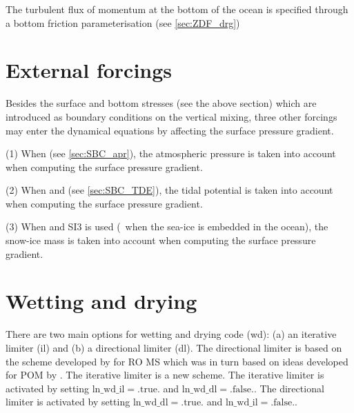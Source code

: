 \documentclass[../main/NEMO_manual]{subfiles}
\begin{document}
The turbulent flux of momentum at the bottom of the ocean is specified through a bottom friction parameterisation
(see \autoref{sec:ZDF_drg})

\section{External forcings}
\label{sec:DYN_forcing}

Besides the surface and bottom stresses (see the above section)
which are introduced as boundary conditions on the vertical mixing,
three other forcings may enter the dynamical equations by affecting the surface pressure gradient.

(1) When  (see \autoref{sec:SBC_apr}),
the atmospheric pressure is taken into account when computing the surface pressure gradient.

(2) When  and  (see \autoref{sec:SBC_TDE}),
the tidal potential is taken into account when computing the surface pressure gradient.

(3) When  and SI3 is used
(\ie\ when the sea-ice is embedded in the ocean),
the snow-ice mass is taken into account when computing the surface pressure gradient.


\section{Wetting and drying }
\label{sec:DYN_wetdry}

There are two main options for wetting and drying code (wd):
(a) an iterative limiter (il) and (b) a directional limiter (dl).
The directional limiter is based on the scheme developed by \cite{warner.defne.ea_CG13} for RO
MS
which was in turn based on ideas developed for POM by \cite{oey_OM06}. The iterative
limiter is a new scheme.  The iterative limiter is activated by setting $\mathrm{ln\_wd\_il} = \mathrm{.true.}$
and $\mathrm{ln\_wd\_dl} = \mathrm{.false.}$. The directional limiter is activated
by setting $\mathrm{ln\_wd\_dl} = \mathrm{.true.}$ and $\mathrm{ln\_wd\_il} = \mathrm{.false.}$.
\end{document}
